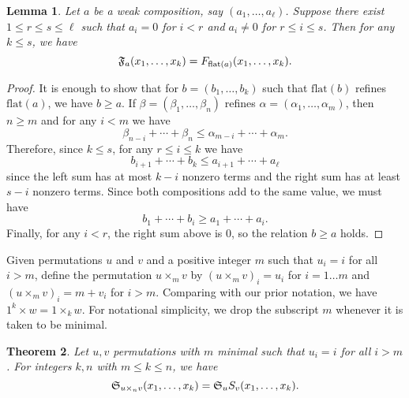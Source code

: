 \documentclass[11pt]{amsart}
\newtheorem{theorem}{Theorem}[section]
\newtheorem{lemma}[theorem]{Lemma}
\theoremstyle{definition}
\theoremstyle{remark}
\numberwithin{equation}{section}
\newcommand{\schubert}{\ensuremath\mathfrak{S}}
\newcommand{\fund}{\ensuremath\mathfrak{F}}
\newcommand{\stanley}{\ensuremath{S}}
\begin{document}
\begin{lemma}
  Let $a$ be a weak composition, say $(a_1,\ldots,a_{\ell})$. Suppose there exist $1 \leq r\leq s \leq \ell$ such that $a_i = 0$ for $i<r$ and $a_i \neq 0$ for $r \leq i \leq s$. Then for any $k \leq s$, we have 
  \begin{equation}
    \fund_{a} (x_1,\ldots,x_k) = F_{\mathrm{flat}(a)}(x_1,\ldots,x_k).
    \label{e:fund-trunc}
  \end{equation}
  \label{lem:fund-trunc}
\end{lemma}

\begin{proof}
  It is enough to show that for $b = (b_1,\ldots,b_k)$ such that $\mathrm{flat}(b)$ refines $\mathrm{flat}(a)$, we have $b \geq a$. If $\beta = (\beta_1,\ldots,\beta_n)$ refines $\alpha = (\alpha_1,\ldots,\alpha_m)$, then $n \geq m$ and for any $i < m$ we have
  \begin{displaymath}
    \beta_{n-i} + \cdots + \beta_{n} \leq \alpha_{m-i} + \cdots + \alpha_{m}.
  \end{displaymath}
  Therefore, since $k\leq s$, for any $r\leq i\leq k$ we have 
  \[ b_{i+1} + \cdots + b_{k} \leq a_{i+1} + \cdots + a_{\ell} \]
  since the left sum has at most $k-i$ nonzero terms and the right sum has at least $s-i$ nonzero terms. Since both compositions add to the same value, we must have
  \[ b_1 + \cdots + b_i \geq a_1 + \cdots + a_i. \]
  Finally, for any $i<r$, the right sum above is $0$, so the relation $b\geq a$ holds.
\end{proof}

Given permutations $u$ and $v$ and a positive integer $m$ such that $u_i = i$ for all $i>m$, define the permutation $u \times_m v$ by $(u \times_m v)_i = u_i$ for $i=1\ldots m$ and $(u \times_m v)_i = m+v_i$ for $i>m$. Comparing with our prior notation, we have $1^k\times w = 1 \times_k w$. For notational simplicity, we drop the subscript $m$ whenever it is taken to be minimal.

\begin{theorem}
  Let $u,v$ permutations with $m$ minimal such that $u_i=i$ for all $i>m$. For integers $k,n$ with $m \leq k \leq n$, we have
  \begin{equation}
    \schubert_{u \times_n v}(x_1,\ldots,x_k) = \schubert_u \stanley_{v} (x_1,\ldots,x_k).
    \label{e:cross}
  \end{equation}
  \label{thm:cross}
\end{theorem}
\end{document}

